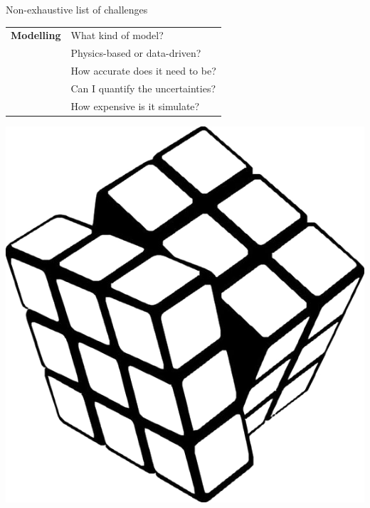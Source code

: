 \documentclass[aspectratio=169,compress,12pt,dvipsnames]{beamer}
\begin{document}
\begin{frame}[t, c]{Non-exhaustive list of challenges}
    \vfill
    \begin{minipage}{.68\textwidth}
        \centering
        \begin{tabular}{rl}
            \textbf{Modelling}  &   What kind of model?                 \\
                                &   Physics-based or data-driven?       \\
                                &   How accurate does it need to be?    \\
                                &   Can I quantify the uncertainties?   \\
                                &   How expensive is it simulate?
        \end{tabular}
    \end{minipage}%
    \hfill
    \begin{minipage}{.28\textwidth}
        \centering
        \includegraphics[width=\textwidth]{rubik_cube.png}
    \end{minipage}
    \vfill
\end{frame}
\end{document}
